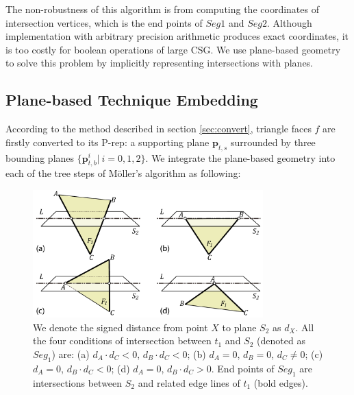 \documentclass[10pt,journal,compsoc]{IEEEtran}
\begin{document}
The non-robustness of this algorithm is from computing the coordinates of intersection vertices, which is the end points of $Seg1$ and $Seg2$. Although implementation with arbitrary precision arithmetic produces exact coordinates, it is too costly for boolean operations of large CSG. We use plane-based geometry to solve this problem by implicitly representing intersections with planes.


\subsection{Plane-based Technique Embedding}

\label{sec:embed}
According to the method described in section \ref{sec:convert}, triangle faces $f$ are firstly converted to its P-rep: a supporting plane $\bm{p}_{t, s}$ surrounded by three bounding planes $\{\bm{p}_{t, b}^i|\ i = 0,1,2\}$. We integrate the plane-based geometry into each of the tree steps of M\"{o}ller's algorithm as following:

\begin{figure}[t]
\centering
\includegraphics[width=3.5in]{sign}
\caption{We denote the signed distance from point $X$ to plane $S_2$ as $d_X$. All the four conditions of intersection between $t_1$ and $S_2$ (denoted as $Seg_1$) are:  (a) $d_A\cdot d_C<0$, $d_B\cdot d_C<0$; (b) $d_A=0$, $d_B=0$, $d_C\neq 0$; (c) $d_A=0$, $d_B\cdot d_C<0$; (d) $d_A=0$, $d_B\cdot d_C>0$. End points of $Seg_1$ are intersections between $S_2$ and related edge lines of $t_1$ (bold edges).}
\label{fig:isect}
\end{figure}
\end{document}

